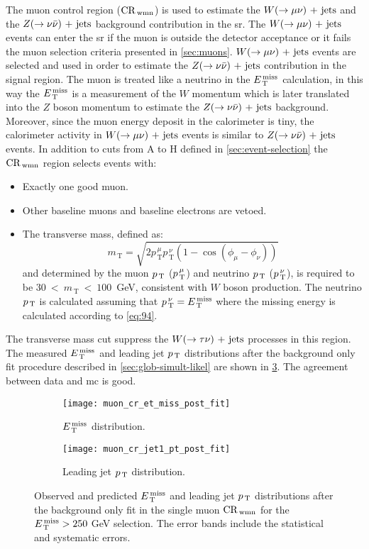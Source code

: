 The muon control region ($\mathrm{CR}_\mathrm{\, wmn}$) is used to estimate the $W (\rightarrow \mu \nu)\mathrm{~+~jets}$ and
the $Z (\rightarrow \nu \bar{\nu})\mathrm{~+~jets}$ background contribution in the \gls{sr}\@. The
$W (\rightarrow \mu \nu)\mathrm{~+~jets}$ events can enter the \gls{sr} if the muon is outside the
detector acceptance or it fails the muon selection criteria presented in
\cref{sec:muons}. $W (\rightarrow \mu \nu)\mathrm{~+~jets}$ events are selected and used in order to
estimate the $Z (\rightarrow \nu \bar{\nu})\mathrm{~+~jets}$ contribution in the signal region. The muon is
treated like a neutrino in the $E_\mathrm{\, T}^\mathrm{\, miss}$ calculation, in this way the $E_\mathrm{\, T}^\mathrm{\, miss}$ is a
measurement of the $W$ momentum which is later translated into the $Z$ boson
momentum to estimate the $Z (\rightarrow \nu \bar{\nu})\mathrm{~+~jets}$ background. Moreover, since the muon
energy deposit in the calorimeter is tiny, the calorimeter activity in
$W (\rightarrow \mu \nu)\mathrm{~+~jets}$ events is similar to $Z (\rightarrow \nu \bar{\nu})\mathrm{~+~jets}$ events. In addition to
cuts from A to H defined in \cref{sec:event-selection} the $\mathrm{CR}_\mathrm{\, wmn}$ region
selects events with:
\begin{itemize}
\item Exactly one good muon.
\item Other baseline muons and baseline electrons are vetoed.
\item The transverse mass, defined as:
  \begin{equation}
    \label{eq:99}
    m_\mathrm{\, T} = \sqrt{2 p_\mathrm{\, T}^{\, \mu} p_\mathrm{\, T}^{\, \nu}
      (1 - \cos(\phi_\mu - \phi_\nu))}
  \end{equation}
  and determined by the muon $p_\mathrm{\, T}$ ($p_\mathrm{\, T}^{\, \mu}$) and neutrino $p_\mathrm{\, T}$
  ($p_\mathrm{\, T}^{\, \nu}$), is required to be $30~<~m_\mathrm{\, T}~<~100$~GeV,
  consistent with $W$ boson production. The neutrino $p_\mathrm{\, T}$ is calculated
  assuming that $p_\mathrm{\, T}^{\, \nu} = E_\mathrm{\, T}^\mathrm{\, miss}$ where the missing energy is calculated
  according to \cref{eq:94}.
\end{itemize}
The transverse mass cut suppress the $W (\rightarrow \tau \nu)\mathrm{~+~jets}$ processes in this
region. The measured $E_\mathrm{\, T}^\mathrm{\, miss}$ and leading jet $p_\mathrm{\, T}$ distributions after the
background only fit procedure described in \cref{sec:glob-simult-likel} are
shown in \cref{fig:muon_cr_plots}. The agreement between data and \gls{mc} is
good.
\begin{figure}[!h]
  \centering
  \begin{subfigure}[t]{.48\linewidth}
    \texttt{[image: muon\_cr\_et\_miss\_post\_fit]}
    \caption{$E_\mathrm{\, T}^\mathrm{\, miss}$ distribution.}
    \label{fig:muon_cr_et_miss_pre_fit}
  \end{subfigure}
  \begin{subfigure}[t]{.48\linewidth}
    \texttt{[image: muon\_cr\_jet1\_pt\_post\_fit]}
    \caption{Leading jet $p_\mathrm{\, T}$ distribution.}
    \label{fig:muon_cr_jet1_pt_pre_fit}
  \end{subfigure}
  \caption{Observed and predicted $E_\mathrm{\, T}^\mathrm{\, miss}$ and leading jet $p_\mathrm{\, T}$ distributions
    after the background only fit in the single muon $\mathrm{CR}_\mathrm{\, wmn}$ for the
    $E_\mathrm{\, T}^\mathrm{\, miss} > 250~$GeV selection. The error bands include the statistical and
    systematic errors.}
  \label{fig:muon_cr_plots}
\end{figure}
